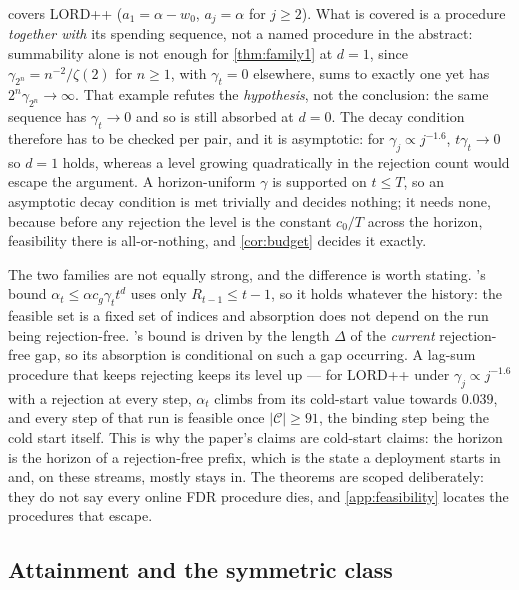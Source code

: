 \documentclass[conference]{IEEEtran}
\newcommand{\Cal}{\mathcal{C}}
\newcommand{\nCal}{\lvert\Cal\rvert}
\newcommand{\alphat}{\alpha_t}
\begin{document}
 covers LORD++ ($a_1=\alpha-w_0$, $a_j=\alpha$ for $j\ge2$). What is covered is a
procedure \emph{together with} its spending sequence, not a named procedure in the abstract:
summability alone is not enough for \cref{thm:family1} at $d=1$, since
$\gamma_{2^n}=n^{-2}/\zeta(2)$ for $n\ge1$, with $\gamma_t=0$ elsewhere, sums to exactly one yet has
$2^n\gamma_{2^n}\to\infty$. That example refutes the \emph{hypothesis}, not the conclusion: the same
sequence has $\gamma_t\to0$ and so is still absorbed at $d=0$. The decay condition therefore has to be
checked per pair, and it is asymptotic: for $\gamma_j\propto j^{-1.6}$, $t\gamma_t\to0$ so $d=1$ holds,
whereas a level growing quadratically in the rejection count would escape the argument. A
horizon-uniform $\gamma$ is supported on $t\le T$, so an asymptotic decay condition is met trivially
and decides nothing; it needs none, because before any rejection the level is the constant $c_0/T$
across the horizon, feasibility there is all-or-nothing, and \cref{cor:budget} decides it exactly.

The two families are not equally strong, and the difference is worth stating. 's
bound $\alphat\le\alpha c_g\gamma_t t^d$ uses only $R_{t-1}\le t-1$, so it holds whatever the history:
the feasible set is a fixed set of indices and absorption does not depend on the run being
rejection-free. 's bound is driven by the length $\Delta$ of the \emph{current}
rejection-free gap, so its absorption is conditional on such a gap occurring. A lag-sum procedure that
keeps rejecting keeps its level up --- for LORD++ under $\gamma_j\propto j^{-1.6}$ with a rejection at
every step, $\alphat$ climbs from its cold-start value towards $0.039$, and every step of that run is
feasible once $\nCal\ge91$, the binding step being the cold start itself. This is why the
paper's claims are cold-start claims: the horizon is the horizon of a rejection-free prefix, which is
the state a deployment starts in and, on these streams, mostly stays in. The theorems are scoped
deliberately: they do not say every online FDR procedure dies, and \cref{app:feasibility} locates the
procedures that escape.

\subsection{Attainment and the symmetric class}\label{app:attain}
\end{document}
